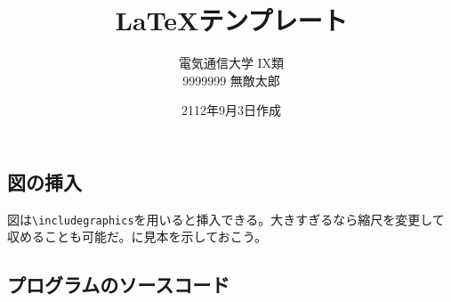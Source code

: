 \documentclass[lualatex,paper=a4paper]{jlreq}
\title{\LaTeX テンプレート} %
\author{電気通信大学 IX類 \\ %
9999999 無敵太郎} %
\date{2112年9月3日作成 %
}
\begin{document}


\maketitle %


\subsection{図の挿入}

図は\verb|\includegraphics|を用いると挿入できる。大きすぎるなら縮尺を変更して収めることも可能だ。に見本を示しておこう。

\subsection{プログラムのソースコード}
\end{document}
